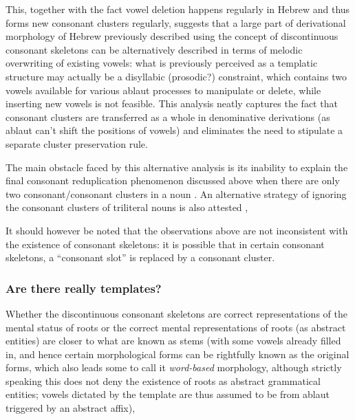 \documentclass[a4paper, oneside, 12pt]{report}
\newcommand*{\citepage}[1]{p.~{#1}}
\newcommand*{\citepages}[1]{pp.~{#1}}
\newcommand*{\term}[1]{\emph{#1}}
\begin{document}
This, together with the fact vowel deletion happens regularly in Hebrew
and thus forms new consonant clusters regularly,
suggests that a large part of derivational morphology of Hebrew 
previously described using the concept of discontinuous consonant skeletons
can be alternatively described in terms of melodic overwriting of existing vowels:
what is previously perceived as a templatic structure 
may actually be a disyllabic (prosodic?) constraint,
which contains two vowels available for various ablaut processes to manipulate or delete,
while inserting new vowels is not feasible.
This analysis neatly captures the fact that consonant clusters are transferred as a whole
in denominative derivations (as ablaut can't shift the positions of vowels)
and eliminates the need to stipulate a separate cluster preservation rule.

The main obstacle faced by this alternative analysis
is its inability to explain the final consonant reduplication phenomenon
discussed above when there are only two consonant/consonant clusters in a noun
\citep[\citepage{136}]{bolozky2008roots}.
An alternative strategy of ignoring the consonant clusters of triliteral nouns is also attested
\citep[\citepages{139-140}]{bolozky2008roots},


It should however be noted that the observations above are not inconsistent with
the existence of consonant skeletons:
it is possible that in certain consonant skeletons,
a ``consonant slot'' is replaced by a consonant cluster.


\subsubsection{Are there really templates?}

Whether the discontinuous consonant skeletons are correct representations of the mental status of roots
or the correct mental representations of roots (as abstract entities) are closer to what are known as stems
(with some vowels already filled in, and hence certain morphological forms
can be rightfully known as the original forms,
which also leads some to call it \term{word-based} morphology,
although strictly speaking this does not deny the existence of roots as abstract grammatical entities;
vowels dictated by the template are thus assumed to be from ablaut triggered by an abstract affix),
\end{document}
